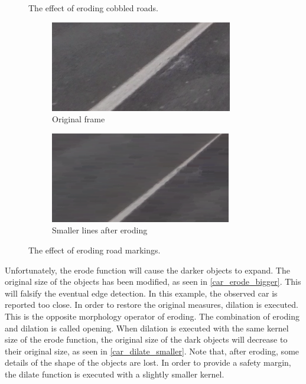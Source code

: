 \documentclass[runningheads,a4paper]{llncs}
\begin{document}
\begin{figure}[ht]
\begin{minipage}[t]{.45\textwidth}
		\caption{The effect of eroding cobbled roads.}
	\end{minipage}%
	\hspace{0.05\textwidth}
	\begin{minipage}[t]{.45\textwidth}
		\centering
		\begin{subfigure}[t]{.5\textwidth}
		  \centering
		  \includegraphics[width=.9\textwidth]{fig/line_zoom_original.png}
		  \caption{Original frame\label{line_zoom_original}}
		\end{subfigure}%
		\begin{subfigure}[t]{.5\textwidth}
		  \centering
		  \includegraphics[width=.9\textwidth]{fig/line_zoom_eroded.png}
		  \caption{Smaller lines after eroding\label{line_zoom_eroded}}
		\end{subfigure}
		\caption{The effect of eroding road markings.}
	\end{minipage}
\end{figure}

Unfortunately, the erode function will cause the darker objects to expand. The original size of the objects has been modified, as seen in \ref{car_erode_bigger}. This will falsify the eventual edge detection. In this example, the observed car is reported too close. In order to restore the original measures, dilation is executed. This is the opposite morphology operator of eroding. The combination of eroding and dilation is called opening. When dilation is executed with the same kernel size of the erode function, the original size of the dark objects will decrease to their original size, as seen in \ref{car_dilate_smaller}. Note that, after eroding, some details of the shape of the objects are lost. In order to provide a safety margin, the dilate function is executed with a slightly smaller kernel.
\end{document}
